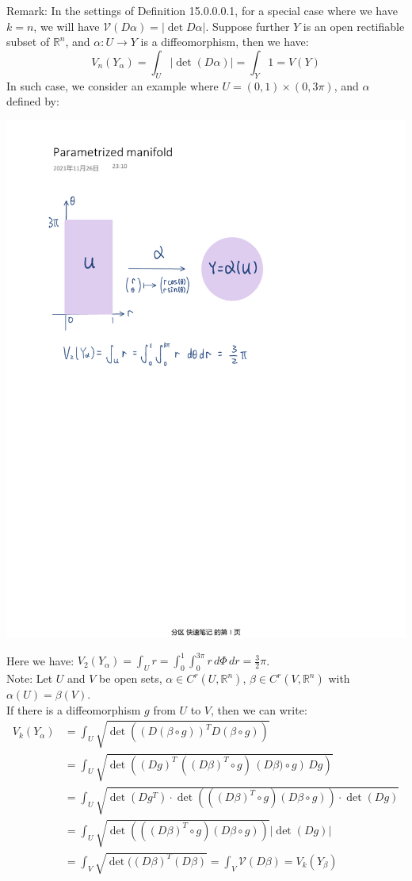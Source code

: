 \documentclass[15pt]{book}
\theoremstyle{break}
\theoremstyle{break}
\newcommand{\R}{\mathbb{R}}
\newcommand{\note}{\color{red}Note: \color{black}}
\newcommand{\remark}{\color{blue}Remark: \color{black}}
\begin{document}
\remark In the settings of Definition 15.0.0.0.1, for a special case where we have $k=n$, we will have $\mathcal{V}(D\alpha) = |\det D\alpha|$. Suppose further $Y$ is an open rectifiable subset of $\R^n$, and $\alpha:U \to Y$ is a diffeomorphism, then we have: 
$$V_n(Y_\alpha) = \int_U|\det (D\alpha)| = \int_Y 1 = V(Y)$$
In such case, we consider an example where $U = (0,1) \times (0,3\pi)$, and $\alpha$ defined by:
\begin{center}
\includegraphics[scale=0.6]{par-manifold.pdf}
\end{center}
Here we have: $V_2(Y_\alpha) = \int_U r = \int_0^1 \int_0^{3\pi} r\, d\Phi \, dr = \frac{3}{2}\pi$.\\

\newpage
\note Let $U$ and $V$ be open sets, $\alpha \in C^r(U,\R^n)$, $\beta\in C^r(V,\R^n)$ with $\alpha(U) = \beta(V)$. \\
If there is a diffeomorphism $g$ from $U$ to $V$, then we can write:
\begin{align*}
V_k(Y_\alpha) &= \int_U \sqrt{\det((D(\beta\circ g))^TD(\beta \circ g))} \\
&= \int_U \sqrt{\det\left((Dg)^T \, \left((D\beta)^T\circ g\right) \, \left(D\beta)\circ g\right)\, Dg\right)}\\
&= \int_U \sqrt{\det(Dg^T) \cdot \det(((D\beta)^T\circ g)(D\beta\circ g))\cdot \det (Dg)}\\
&= \int_U \sqrt{\det(((D\beta)^T\circ g)(D\beta\circ g))} |\det(Dg)|\\
&= \int_V \sqrt{\det((D\beta)^T(D\beta)}= \int_V \mathcal{V}(D\beta)= V_k(Y_\beta)
\end{align*}
\end{document}
